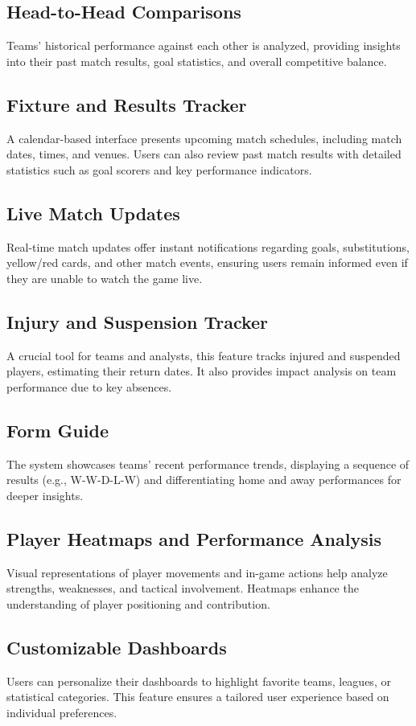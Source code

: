 \subsection{Head-to-Head Comparisons}
Teams' historical performance against each other is analyzed, providing insights into their past match results, goal statistics, and overall competitive balance.

\subsection{Fixture and Results Tracker}
A calendar-based interface presents upcoming match schedules, including match dates, times, and venues. Users can also review past match results with detailed statistics such as goal scorers and key performance indicators.

\subsection{Live Match Updates}
Real-time match updates offer instant notifications regarding goals, substitutions, yellow/red cards, and other match events, ensuring users remain informed even if they are unable to watch the game live.

\subsection{Injury and Suspension Tracker}
A crucial tool for teams and analysts, this feature tracks injured and suspended players, estimating their return dates. It also provides impact analysis on team performance due to key absences.

\subsection{Form Guide}
The system showcases teams' recent performance trends, displaying a sequence of results (e.g., W-W-D-L-W) and differentiating home and away performances for deeper insights.

\subsection{Player Heatmaps and Performance Analysis}
Visual representations of player movements and in-game actions help analyze strengths, weaknesses, and tactical involvement. Heatmaps enhance the understanding of player positioning and contribution.

\subsection{Customizable Dashboards}
Users can personalize their dashboards to highlight favorite teams, leagues, or statistical categories. This feature ensures a tailored user experience based on individual preferences.

